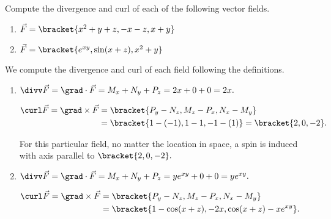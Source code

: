 \begin{example}\label{ex_vectorfield2}
Compute the divergence and curl of each of the following vector fields.
\begin{enumerate}
	\item $\vec F =\bracket{x^2+y+z, -x-z, x+y}$
	\item	$\vec F =\bracket{e^{xy}, \sin(x+z),x^2+y}$
\end{enumerate}
\solution
We compute the divergence and curl of each field following the definitions.
\begin{enumerate}
	\item $\divv \vec F = \grad \cdot \vec F = M_x+N_y+P_z = 2x+0+0= 2x.$
	
	$\begin{aligned}\curl\vec F = \grad \times \vec F &=\bracket{P_y-N_z,M_z-P_x,N_x - M_y}\\ &=\bracket{1 - (-1), 1-1,-1-(1)}=\bracket{2,0,-2}.
	\end{aligned}$
	
	For this particular field, no matter the location in space, a spin is induced with axis parallel to $\bracket{2,0,-2}.$
	\item $\divv \vec F = \grad \cdot \vec F = M_x+N_y+P_z = ye^{xy}+0+0= ye^{xy}.$
		
	$\begin{aligned}\curl\vec F = \grad \times \vec F &=\bracket{P_y-N_z,M_z-P_x,N_x - M_y}\\ &=\bracket{1-\cos(x+z), -2x, \cos(x+z) - xe^{xy}}.\end{aligned}$
\end{enumerate}
\end{example}

